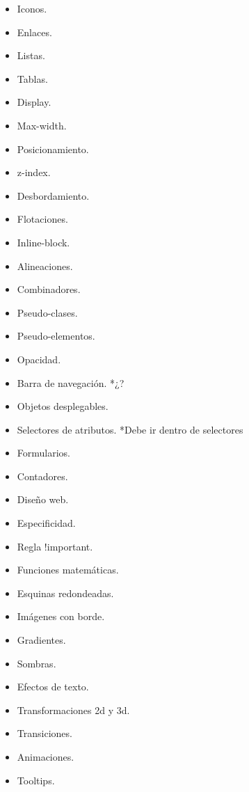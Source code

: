 \documentclass[12pt, letterpaper]{article}
\begin{document}
\begin{enumerate}
\begin{itemize}
\begin{enumerate}
\begin{itemize}
                \item Iconos.
                \item Enlaces.
                \item Listas.
                \item Tablas.
                \item Display.
                \item Max-width.
                \item Posicionamiento.
                \item z-index.
                \item Desbordamiento.
                \item Flotaciones.
                \item Inline-block.
                \item Alineaciones.
                \item Combinadores.
                \item Pseudo-clases.
                \item Pseudo-elementos.
                \item Opacidad.
                \item Barra de navegación. *¿?
                \item Objetos desplegables.
                \item Selectores de atributos. *Debe ir dentro de selectores
                \item Formularios.
                \item Contadores.
                \item Diseño web.
                \item Especificidad.
                \item Regla !important.
                \item Funciones matemáticas.
                \item Esquinas redondeadas.
                \item Imágenes con borde.
                \item Gradientes.
                \item Sombras.
                \item Efectos de texto.
                \item Transformaciones 2d y 3d.
                \item Transiciones.
                \item Animaciones.
                \item Tooltips.

\end{itemize}
\end{enumerate}
\end{itemize}
\end{enumerate}
\end{document}
